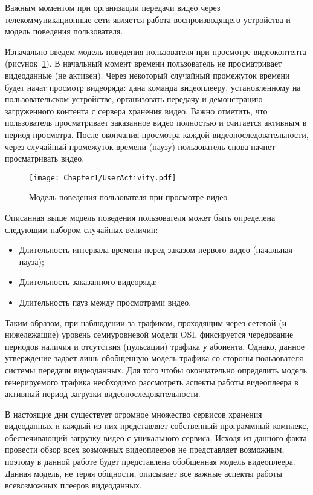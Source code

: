 Важным моментом при организации передачи видео через телекоммуникационные сети является работа воспроизводящего устройства и модель поведения пользователя.

Изначально введем модель поведения пользователя при просмотре видеоконтента (рисунок~\ref{fig:UserActivity}). В начальный момент времени пользователь не просматривает видеоданные (не активен). Через некоторый случайный промежуток времени будет начат просмотр видеоряда: дана команда видеоплееру, установленному на пользовательском устройстве, организовать передачу и демонстрацию загруженного контента с сервера хранения видео. Важно отметить, что пользователь просматривает заказанное видео полностью и считается активным в период просмотра. После окончания просмотра каждой видеопоследовательности, через случайный промежуток времени (паузу) пользователь снова начнет просматривать видео.

\begin{figure}[htbp]
\begin{center}
\texttt{[image: Chapter1/UserActivity.pdf]}
\caption{Модель поведения пользователя при просмотре видео}
\label{fig:UserActivity}
\end{center}
\end{figure}

Описанная выше модель поведения пользователя может быть определена следующим набором случайных величин:
\begin{itemize}
  \item Длительность интервала времени перед заказом первого видео (начальная пауза);
  \item Длительность заказанного видеоряда;
  \item Длительность пауз между просмотрами видео.
\end{itemize}

Таким образом, при наблюдении за трафиком, проходящим через сетевой (и нижележащие) уровень семиуровневой модели OSI, фиксируется чередование периодов наличия и отсутствия (пульсации) трафика у абонента. Однако, данное утверждение задает лишь обобщенную модель трафика со стороны пользователя системы передачи видеоданных. Для того чтобы окончательно определить модель генерируемого трафика необходимо рассмотреть аспекты работы видеоплеера в активный период загрузки видеопоследовательности.

В настоящие дни существует огромное множество сервисов хранения видеоданных и каждый из них представляет собственный программный комплекс, обеспечивающий загрузку видео с уникального сервиса. Исходя из данного факта провести обзор всех возможных видеоплееров не представляет возможным, поэтому в данной работе будет представлена обобщенная модель видеоплеера. Данная модель, не теряя общности, описывает все важные аспекты работы всевозможных плееров видеоданных.

